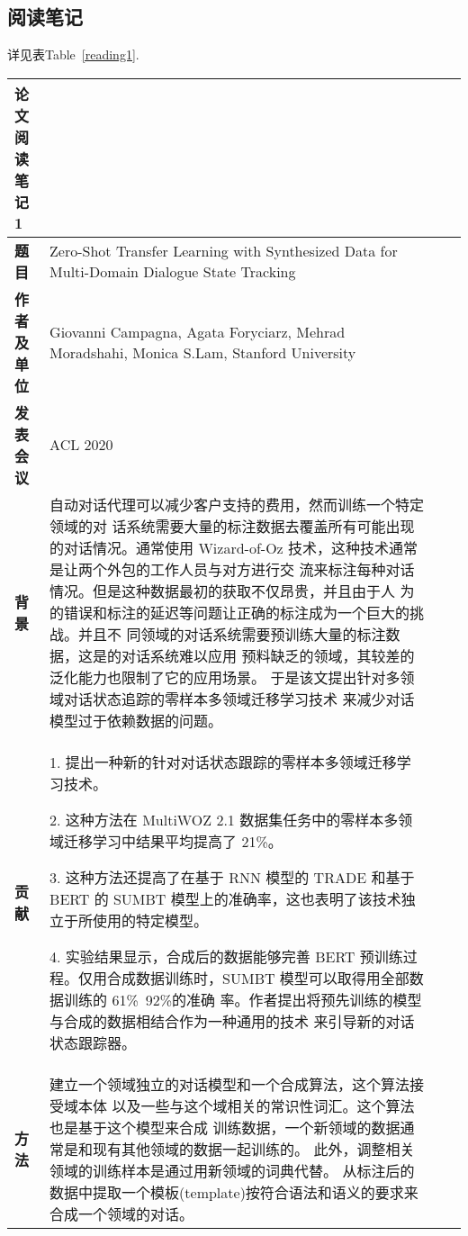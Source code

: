 \documentclass[11pt]{article}
\begin{document}
\begin{CJK}{UTF8}{gkai}
\subsection{阅读笔记}
详见表Table~\ref{reading1}.

\begin{table*}[h]\small
\centering
		\begin{tabular}{lp{10cm}lp{25cm}}
		\toprule 
		\textbf{论文阅读笔记1}\\ \hline
		\textbf{题目} & Zero-Shot Transfer Learning with Synthesized Data for Multi-Domain Dialogue State Tracking \\ \hline
		\textbf{作者及单位} & Giovanni Campagna, Agata Foryciarz, Mehrad Moradshahi, Monica S.Lam, Stanford University\\ \hline
		\textbf{发表会议} & ACL 2020 \\ \midrule
		\textbf{背景} & 自动对话代理可以减少客户支持的费用，然而训练一个特定领域的对 话系统需要大量的标注数据去覆盖所有可能出现的对话情况。通常使用 Wizard-of-Oz 技术，这种技术通常是让两个外包的工作人员与对方进行交 流来标注每种对话情况。但是这种数据最初的获取不仅昂贵，并且由于人 为的错误和标注的延迟等问题让正确的标注成为一个巨大的挑战。并且不 同领域的对话系统需要预训练大量的标注数据，这是的对话系统难以应用 预料缺乏的领域，其较差的泛化能力也限制了它的应用场景。
于是该文提出针对多领域对话状态追踪的零样本多领域迁移学习技术 来减少对话模型过于依赖数据的问题。 \\ \hline
              \textbf{贡献} & 
              1. 提出一种新的针对对话状态跟踪的零样本多领域迁移学习技术。
              
              2. 这种方法在 MultiWOZ 2.1 数据集任务中的零样本多领域迁移学习中结果平均提高了 21\%。
              
              3. 这种方法还提高了在基于 RNN 模型的 TRADE 和基于 BERT 的 SUMBT
模型上的准确率，这也表明了该技术独立于所使用的特定模型。

             4. 实验结果显示，合成后的数据能够完善 BERT 预训练过程。仅用合成数据训练时，SUMBT 模型可以取得用全部数据训练的 61\%~92\%的准确 率。作者提出将预先训练的模型与合成的数据相结合作为一种通用的技术
来引导新的对话状态跟踪器。
             \\ \hline
              \textbf{方法} & 建立一个领域独立的对话模型和一个合成算法，这个算法接受域本体 以及一些与这个域相关的常识性词汇。这个算法也是基于这个模型来合成 训练数据，一个新领域的数据通常是和现有其他领域的数据一起训练的。 此外，调整相关领域的训练样本是通过用新领域的词典代替。
从标注后的数据中提取一个模板(template)按符合语法和语义的要求来合成一个领域的对话。


\end{tabular}
\end{table*}
\end{CJK}
\end{document}

